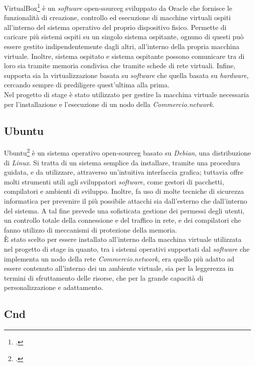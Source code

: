 VirtualBox\footcite{site:virtual-box} è un \textit{software} \gls{open-sourceg} sviluppato da Oracle che fornisce le funzionalità di creazione, controllo ed esecuzione di macchine virtuali ospiti all'interno del sistema operativo del proprio dispositivo fisico. Permette di caricare più sistemi ospiti su un singolo sistema ospitante, ognuno di questi può essere gestito indipendentemente dagli altri, all'interno della propria macchina virtuale. Inoltre, sistema ospitato e sistema ospitante possono comunicare tra di loro sia tramite memoria condivisa che tramite schede di rete virtuali. Infine, supporta sia la virtualizzazione basata su \textit{software} che quella basata su \textit{hardware}, cercando sempre di prediligere quest'ultima alla prima.\\
Nel progetto di stage è stato utilizzato per gestire la macchina virtuale necessaria per l'installazione e l'esecuzione di un nodo della \textit{Commercio.network}.

\subsection*{Ubuntu}

Ubuntu\footcite{site:ubuntu} è un sistema operativo \gls{open-sourceg} basato su \textit{Debian}, una distribuzione di \textit{Linux}. Si tratta di un sistema semplice da installare, tramite una procedura guidata, e da utilizzare, attraverso un'intuitiva interfaccia grafica; tuttavia offre molti strumenti utili agli sviluppatori \textit{software}, come gestori di pacchetti, compilatori e ambienti di sviluppo. Inoltre, fa uso di molte tecniche di sicurezza informatica per prevenire il più possibile attacchi sia dall'esterno che dall'interno del sistema. A tal fine prevede una sofisticata gestione dei permessi degli utenti, un controllo totale della connessione e del traffico in rete, e dei compilatori che fanno utilizzo di meccanismi di protezione della memoria. \\
È stato scelto per essere installato all'interno della macchina virtuale utilizzata nel progetto di stage in quanto, tra i sistemi operativi supportati dal \textit{software} che implementa un nodo della rete \textit{Commercio.network}, era quello più adatto ad essere contenuto all'interno dei un ambiente virtuale, sia per la leggerezza in termini di sfruttamento delle risorse, che per la grande capacità di personalizzazione e adattamento.

\subsection*{Cnd}

